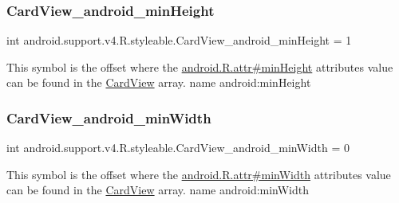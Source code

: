 \subsubsection{\texorpdfstring{Card\+View\+\_\+android\+\_\+min\+Height}{CardView\_android\_minHeight}}
{\footnotesize\ttfamily int android.\+support.\+v4.\+R.\+styleable.\+Card\+View\+\_\+android\+\_\+min\+Height = 1\hspace{0.3cm}{\ttfamily [static]}}

This symbol is the offset where the \hyperlink{}{android.\+R.\+attr\#min\+Height} attribute\textquotesingle{}s value can be found in the \hyperlink{classandroid_1_1support_1_1v4_1_1R_1_1styleable_a0e520cd4c78beb0d456e4018c4ba0e86}{Card\+View} array.  name android\+:min\+Height \mbox{\label{classandroid_1_1support_1_1v4_1_1R_1_1styleable_a4c667d1c23f054057861f222b3725f20}} 
\subsubsection{\texorpdfstring{Card\+View\+\_\+android\+\_\+min\+Width}{CardView\_android\_minWidth}}
{\footnotesize\ttfamily int android.\+support.\+v4.\+R.\+styleable.\+Card\+View\+\_\+android\+\_\+min\+Width = 0\hspace{0.3cm}{\ttfamily [static]}}

This symbol is the offset where the \hyperlink{}{android.\+R.\+attr\#min\+Width} attribute\textquotesingle{}s value can be found in the \hyperlink{classandroid_1_1support_1_1v4_1_1R_1_1styleable_a0e520cd4c78beb0d456e4018c4ba0e86}{Card\+View} array.  name android\+:min\+Width \mbox{\label{classandroid_1_1support_1_1v4_1_1R_1_1styleable_add1dcf3149907ef88fe6cae0109b1aed}} 
